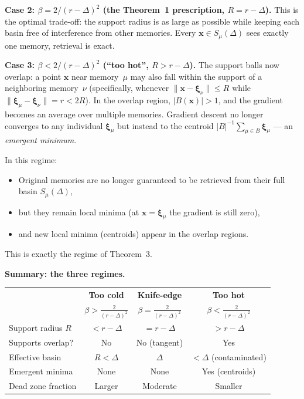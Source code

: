 \documentclass[11pt]{article}
\begin{document}
\textbf{Case 2: $\beta = 2/(r-\Delta)^2$ \;(the Theorem~1 prescription,
$R = r-\Delta$).}
This is the optimal trade-off: the support radius is as large as possible
while keeping each basin free of interference from other memories.  Every
$\mathbf{x}\in S_\mu(\Delta)$ sees exactly one memory, retrieval is exact.

\textbf{Case 3: $\beta < 2/(r-\Delta)^2$ \;(``too hot'', $R > r-\Delta$).}
The support balls now overlap: a point $\mathbf{x}$ near memory~$\mu$ may
also fall within the support of a neighboring memory~$\nu$ (specifically,
whenever $\|\mathbf{x}-\boldsymbol{\xi}_\nu\| \leq R$ while
$\|\boldsymbol{\xi}_\mu - \boldsymbol{\xi}_\nu\| = r < 2R$).  In the overlap
region, $|B(\mathbf{x})| > 1$, and the gradient becomes an average over
multiple memories.  Gradient descent no longer converges to any individual
$\boldsymbol{\xi}_\mu$ but instead to the centroid
$|B|^{-1}\sum_{\mu\in B}\boldsymbol{\xi}_\mu$ --- an \emph{emergent minimum}.

In this regime:
\begin{itemize}
  \item Original memories are no longer guaranteed to be retrieved from
        their full basin $S_\mu(\Delta)$,
  \item but they remain local minima (at $\mathbf{x} = \boldsymbol{\xi}_\mu$
        the gradient is still zero),
  \item and new local minima (centroids) appear in the overlap regions.
\end{itemize}
This is exactly the regime of Theorem~3.

\medskip
\textbf{Summary: the three regimes.}
\begin{center}
\setlength{\tabcolsep}{4pt}
\begin{tabular}{lccc}
\toprule
& \textbf{Too cold} & \textbf{Knife-edge} & \textbf{Too hot} \\
& $\beta > \frac{2}{(r-\Delta)^2}$ & $\beta = \frac{2}{(r-\Delta)^2}$ &
  $\beta < \frac{2}{(r-\Delta)^2}$ \\
\midrule
Support radius $R$ & $< r - \Delta$ & $= r - \Delta$ & $> r - \Delta$ \\
Supports overlap? & No & No (tangent) & Yes \\
Effective basin & $R < \Delta$ & $\Delta$ & $< \Delta$ (contaminated) \\
Emergent minima & None & None & Yes (centroids) \\
Dead zone fraction & Larger & Moderate & Smaller \\
\bottomrule
\end{tabular}
\end{center}
\end{document}
